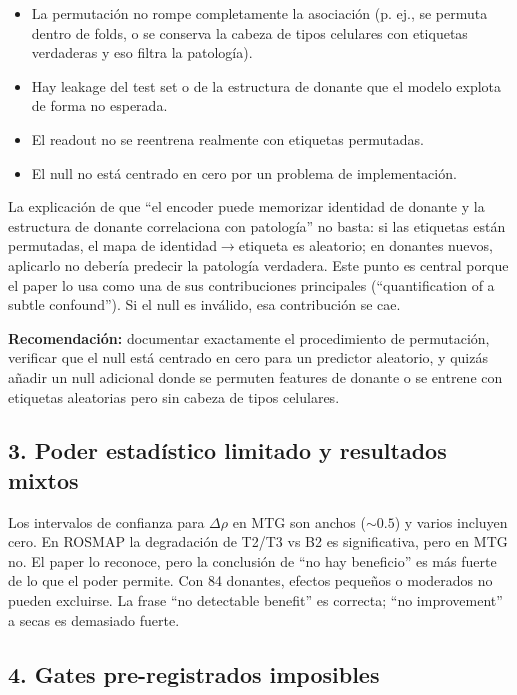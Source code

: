 \documentclass[11pt,a4paper]{article}
\begin{document}
\begin{itemize}
    \item La permutación no rompe completamente la asociación (p. ej., se permuta dentro de folds, o se conserva la cabeza de tipos celulares con etiquetas verdaderas y eso filtra la patología).
    \item Hay leakage del test set o de la estructura de donante que el modelo explota de forma no esperada.
    \item El readout no se reentrena realmente con etiquetas permutadas.
    \item El null no está centrado en cero por un problema de implementación.
\end{itemize}

La explicación de que ``el encoder puede memorizar identidad de donante y la estructura de donante correlaciona con patología'' no basta: si las etiquetas están permutadas, el mapa de identidad$\rightarrow$etiqueta es aleatorio; en donantes nuevos, aplicarlo no debería predecir la patología verdadera. Este punto es central porque el paper lo usa como una de sus contribuciones principales (``quantification of a subtle confound''). Si el null es inválido, esa contribución se cae.

\textbf{Recomendación:} documentar exactamente el procedimiento de permutación, verificar que el null está centrado en cero para un predictor aleatorio, y quizás añadir un null adicional donde se permuten features de donante o se entrene con etiquetas aleatorias pero sin cabeza de tipos celulares.

\subsection*{3. Poder estadístico limitado y resultados mixtos}

Los intervalos de confianza para $\Delta\rho$ en MTG son anchos ($\sim 0.5$) y varios incluyen cero. En ROSMAP la degradación de T2/T3 vs B2 es significativa, pero en MTG no. El paper lo reconoce, pero la conclusión de ``no hay beneficio'' es más fuerte de lo que el poder permite. Con 84 donantes, efectos pequeños o moderados no pueden excluirse. La frase ``no detectable benefit'' es correcta; ``no improvement'' a secas es demasiado fuerte.

\subsection*{4. Gates pre-registrados imposibles}
\end{document}
